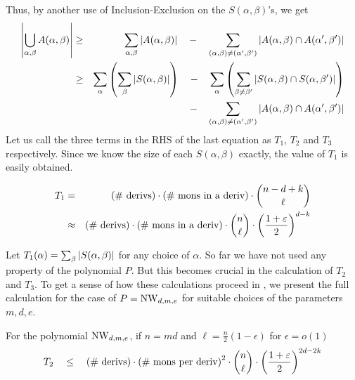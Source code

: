 Thus, by another use of Inclusion-Exclusion on the $S(\alpha, \beta)$'s, we get
\begin{eqnarray*}
\left|\bigcup_{\alpha, \beta}A(\alpha,\beta)\right|&\geq& \sum_{\alpha,\beta}\left|A(\alpha, \beta)\right| \quad - \quad \sum_{(\alpha, \beta)\neq (\alpha',\beta')}\left|A(\alpha, \beta) \cap A(\alpha',\beta')\right|\\
 & \geq & \sum_\alpha \left(\sum_\beta \left|S(\alpha, \beta)\right|\right) \quad - \quad \sum_\alpha \left(\sum_{\beta \neq \beta'}\left|S(\alpha, \beta)\cap S(\alpha,\beta')\right|\right)\\
 & & \quad\quad \quad - \quad \sum_{(\alpha, \beta)\neq (\alpha',\beta')}\left|A(\alpha, \beta) \cap A(\alpha',\beta')\right|
\end{eqnarray*}
Let us call the three terms in the RHS of the last equation as $T_1$, $T_2$ and $T_3$ respectively. 
Since we know the size of each $S(\alpha, \beta)$ exactly, the value of $T_1$ is easily obtained. 
\begin{lemma}[\cite{KS14}]\label{lem:T_1-value}
\begin{eqnarray*}
T_1 &=& \text{(\# derivs)} \cdot \text{(\# mons in a deriv)} \cdot \binom{n-d+k}{\ell}\\
    & \approx & \text{(\# derivs)} \cdot \text{(\# mons in a deriv)} \cdot \binom{n}{\ell} \cdot \left(\frac{1+\varepsilon}{2}\right)^{d-k}\\
\end{eqnarray*}
\end{lemma}
Let $T_1(\alpha) =\sum_\beta \left|S(\alpha, \beta)\right|$ for any choice of $\alpha$. 
So far we have not used any property of the polynomial $P$. 
But this becomes crucial in the calculation of $T_2$ and $T_3$. 
To get a sense of how these calculations proceed in \cite{KS14}, we present the full calculation for the case of $P = \mathrm{NW}_{d,m,e}$ for suitable choices of the parameters $m,d,e$. 
\begin{lemma}[\cite{KS14}]\label{lem:T_2-for-NW}
For the polynomial $\mathrm{NW}_{d,m,e}$, if $n = md$ and $\ell = \frac{n}{2}(1 - \epsilon)$ for $\epsilon = o(1)$
\[
T_2 \quad \leq \quad\text{(\# derivs)} \cdot \text{(\# mons per deriv)}^2\cdot \binom{n}{\ell} \cdot \left(\frac{1+\varepsilon}{2}\right)^{2d -2k}
\]
\end{lemma}
